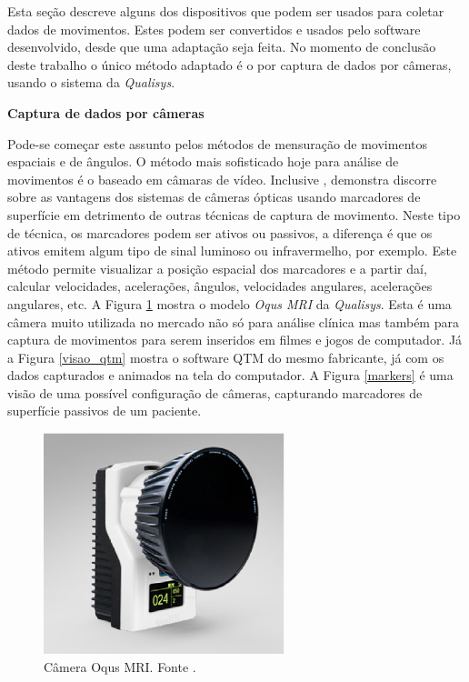 Esta seção descreve alguns dos dispositivos que podem ser usados para coletar dados de movimentos. 
Estes podem ser convertidos e usados pelo software desenvolvido, desde que uma adaptação seja feita. 
No momento de conclusão deste trabalho o único método adaptado é o por captura de dados por câmeras, usando o sistema da \emph{Qualisys}.

\textbf{Captura de dados por câmeras}

\noindent
Pode-se começar este assunto pelos métodos de mensuração de movimentos espaciais e de ângulos.
O método mais sofisticado hoje para análise de movimentos é o baseado em câmaras de vídeo. 
Inclusive , demonstra discorre sobre as vantagens dos sistemas de câmeras ópticas usando marcadores de superfície em detrimento de outras técnicas de captura de movimento. 
Neste tipo de técnica, os marcadores podem ser ativos ou passivos, a diferença é que os ativos emitem algum tipo de sinal luminoso ou infravermelho, por exemplo. 
Este método permite visualizar a posição espacial dos marcadores e a partir daí, calcular velocidades, acelerações, ângulos, velocidades angulares, acelerações angulares, etc.
A Figura \ref{oqus_mri} mostra o modelo \emph{Oqus MRI} da \emph{Qualisys}. Esta é uma câmera muito utilizada no mercado não só para análise clínica mas também para captura de movimentos para serem inseridos em filmes e jogos de computador. 
Já a Figura \ref{visao_qtm} mostra o software QTM do mesmo fabricante, já com os dados capturados e animados na tela do computador.
A Figura \ref{markers} é uma visão de uma possível configuração de câmeras, capturando marcadores de superfície passivos de um paciente.

\begin{figure}[H]
	\centering
	\includegraphics[width=7cm]{figuras/oqus-mri.eps}
	\caption{Câmera Oqus MRI. Fonte \cite{Qualisys2013}.
}
	\label{oqus_mri}
\end{figure}


